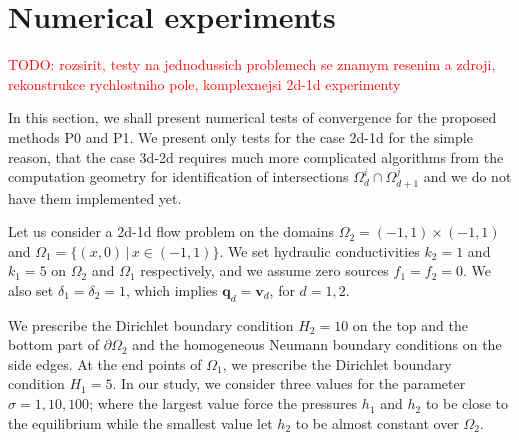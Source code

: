 \documentclass[times]{nlaauth}%
\def\vc#1{\mathbf{\boldsymbol{#1}}}     %
\def\where{\,|\,}                    %
\def\prtl{\partial}                                        %
\def\todo#1{\textcolor{red}{TODO: #1} }
\begin{document}
\section{Numerical experiments}
\todo{rozsirit, testy na jednodussich problemech se znamym resenim a zdroji, rekonstrukce rychlostniho pole, komplexnejsi 2d-1d experimenty}

In this section, we shall present numerical tests of convergence for the proposed methods P0 and P1.
We present only tests for the case 2d-1d for the simple reason, that the case 3d-2d requires much more complicated
algorithms from the computation geometry for identification of 
intersections $\Omega_d^i \cap \Omega_{d+1}^j$ and we do not have them implemented yet.

Let us consider a 2d-1d flow problem on the domains
$\Omega_2=(-1,1)\times(-1,1)$ and $\Omega_1=\{ (x,0) \where x\in (-1,1) \}$. We set hydraulic conductivities $k_2=1$ and $k_1=5$ 
on $\Omega_2$ and $\Omega_1$ respectively, and we assume zero sources $f_1=f_2=0$. We also set $\delta_1=\delta_2=1$, which implies
$\vc q_d = \vc v_d$, for $d=1,2$.

We prescribe the Dirichlet boundary condition $H_2=10$ on the top and the bottom part of $\prtl\Omega_2$ 
and the homogeneous Neumann boundary conditions on the side edges. At the end points of $\Omega_1$, we prescribe the 
Dirichlet boundary condition 
$H_1=5$. In our study, we consider three values for the parameter $\sigma = 1, 10, 100$; where the largest value force
the pressures $h_1$ and $h_2$ to be close to the equilibrium while the smallest value let $h_2$ to be almost constant over $\Omega_2$.
\end{document}
